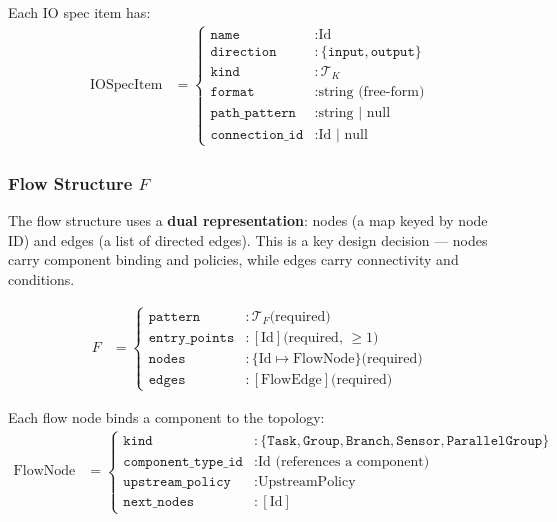 \documentclass[11pt,a4paper]{article}
\theoremstyle{definition}
\begin{document}
Each IO spec item has:
\begin{align}
\text{IOSpecItem} &=
\begin{cases}
\texttt{name}          &: \text{Id} \\
\texttt{direction}     &: \{\texttt{input}, \texttt{output}\} \\
\texttt{kind}          &: \mathcal{T}_K \\
\texttt{format}        &: \text{string (free-form)} \\
\texttt{path\_pattern}  &: \text{string | null} \\
\texttt{connection\_id} &: \text{Id | null}
\end{cases}
\end{align}

\subsubsection{Flow Structure $F$}
The flow structure uses a \textbf{dual representation}: nodes (a map keyed by node ID) and edges (a list of directed edges). This is a key design decision — nodes carry component binding and policies, while edges carry connectivity and conditions.

\begin{align}
F &=
\begin{cases}
\texttt{pattern}      &: \mathcal{T}_F \text{(required)} \\
\texttt{entry\_points}&: [\text{Id}] \text{(required, } \geq 1) \\
\texttt{nodes}        &: \{\text{Id} \mapsto \text{FlowNode}\} \text{(required)} \\
\texttt{edges}        &: [\text{FlowEdge}] \text{(required)}
\end{cases}
\end{align}

Each flow node binds a component to the topology:
\begin{align}
\text{FlowNode} &=
\begin{cases}
\texttt{kind}              &: \{\texttt{Task}, \texttt{Group}, \texttt{Branch}, \texttt{Sensor}, \texttt{ParallelGroup}\} \\
\texttt{component\_type\_id}&: \text{Id (references a component)} \\
\texttt{upstream\_policy}   &: \text{UpstreamPolicy} \\
\texttt{next\_nodes}        &: [\text{Id}]
\end{cases}
\end{align}
\end{document}
